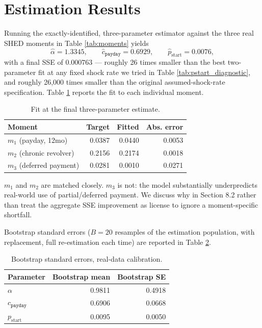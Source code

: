 \documentclass[12pt]{article}
\begin{document}
\section{Estimation Results}

Running the exactly-identified, three-parameter estimator against the three real SHED moments in Table \ref{tab:moments} yields
\begin{equation}
    \hat\alpha = 1.3345, \qquad \hat c_{\texttt{payday}} = 0.6929, \qquad \hat p_{\text{start}} = 0.0076,
\end{equation}
with a final SSE of $0.000763$ — roughly 26 times smaller than the best two-parameter fit at any fixed shock rate we tried in Table \ref{tab:pstart_diagnostic}, and roughly 26,000 times smaller than the original assumed-shock-rate specification. Table \ref{tab:fit} reports the fit to each individual moment.

\begin{table}[h]
\centering
\begin{tabular}{@{}lrrr@{}}
\toprule
Moment & Target & Fitted & Abs. error \\
\midrule
$m_1$ (payday, 12mo) & 0.0387 & 0.0440 & 0.0053 \\
$m_2$ (chronic revolver) & 0.2156 & 0.2174 & 0.0018 \\
$m_3$ (deferred payment) & 0.0281 & 0.0010 & 0.0271 \\
\bottomrule
\end{tabular}
\caption{Fit at the final three-parameter estimate.}
\label{tab:fit}
\end{table}

$m_1$ and $m_2$ are matched closely. $m_3$ is not: the model substantially underpredicts real-world use of partial/deferred payment. We discuss why in Section 8.2 rather than treat the aggregate SSE improvement as license to ignore a moment-specific shortfall.

Bootstrap standard errors ($B=20$ resamples of the estimation population, with replacement, full re-estimation each time) are reported in Table \ref{tab:bootstrap_real}.

\begin{table}[h]
\centering
\begin{tabular}{@{}lrr@{}}
\toprule
Parameter & Bootstrap mean & Bootstrap SE \\
\midrule
$\alpha$ & 0.9811 & 0.4918 \\
$c_{\texttt{payday}}$ & 0.6906 & 0.0668 \\
$p_{\text{start}}$ & 0.0095 & 0.0050 \\
\bottomrule
\end{tabular}
\caption{Bootstrap standard errors, real-data calibration.}
\label{tab:bootstrap_real}
\end{table}
\end{document}
